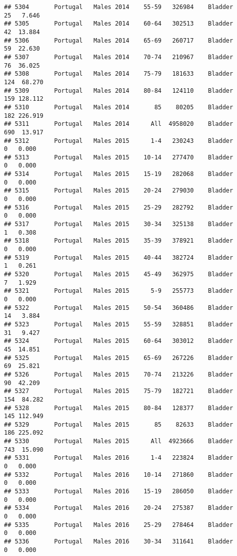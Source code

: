 \documentclass[
]{article}
\begin{document}
\begin{verbatim}
## 5304       Portugal   Males 2014    55-59   326984    Bladder     25   7.646
## 5305       Portugal   Males 2014    60-64   302513    Bladder     42  13.884
## 5306       Portugal   Males 2014    65-69   260717    Bladder     59  22.630
## 5307       Portugal   Males 2014    70-74   210967    Bladder     76  36.025
## 5308       Portugal   Males 2014    75-79   181633    Bladder    124  68.270
## 5309       Portugal   Males 2014    80-84   124110    Bladder    159 128.112
## 5310       Portugal   Males 2014       85    80205    Bladder    182 226.919
## 5311       Portugal   Males 2014      All  4958020    Bladder    690  13.917
## 5312       Portugal   Males 2015      1-4   230243    Bladder      0   0.000
## 5313       Portugal   Males 2015    10-14   277470    Bladder      0   0.000
## 5314       Portugal   Males 2015    15-19   282068    Bladder      0   0.000
## 5315       Portugal   Males 2015    20-24   279030    Bladder      0   0.000
## 5316       Portugal   Males 2015    25-29   282792    Bladder      0   0.000
## 5317       Portugal   Males 2015    30-34   325138    Bladder      1   0.308
## 5318       Portugal   Males 2015    35-39   378921    Bladder      0   0.000
## 5319       Portugal   Males 2015    40-44   382724    Bladder      1   0.261
## 5320       Portugal   Males 2015    45-49   362975    Bladder      7   1.929
## 5321       Portugal   Males 2015      5-9   255773    Bladder      0   0.000
## 5322       Portugal   Males 2015    50-54   360486    Bladder     14   3.884
## 5323       Portugal   Males 2015    55-59   328851    Bladder     31   9.427
## 5324       Portugal   Males 2015    60-64   303012    Bladder     45  14.851
## 5325       Portugal   Males 2015    65-69   267226    Bladder     69  25.821
## 5326       Portugal   Males 2015    70-74   213226    Bladder     90  42.209
## 5327       Portugal   Males 2015    75-79   182721    Bladder    154  84.282
## 5328       Portugal   Males 2015    80-84   128377    Bladder    145 112.949
## 5329       Portugal   Males 2015       85    82633    Bladder    186 225.092
## 5330       Portugal   Males 2015      All  4923666    Bladder    743  15.090
## 5331       Portugal   Males 2016      1-4   223824    Bladder      0   0.000
## 5332       Portugal   Males 2016    10-14   271860    Bladder      0   0.000
## 5333       Portugal   Males 2016    15-19   286050    Bladder      0   0.000
## 5334       Portugal   Males 2016    20-24   275387    Bladder      0   0.000
## 5335       Portugal   Males 2016    25-29   278464    Bladder      0   0.000
## 5336       Portugal   Males 2016    30-34   311641    Bladder      0   0.000

\end{verbatim}
\end{document}
